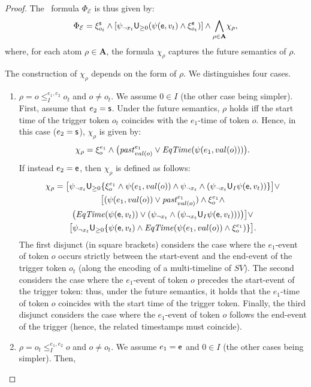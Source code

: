 \begin{proof}
The \MTL\ formula $\Phi_{\mathcal{E}}$ is thus given by:
\[
\Phi_{\mathcal{E}}=\xi^{\mathsf{s}}_{o_t} \wedge [\psi_{\neg x_t}\textsf{U}_{\geq 0}(\psi(\mathsf{e},v_t)\wedge \xi^{\mathsf{e}}_{o_t})]\wedge \displaystyle{\bigwedge_{\rho\in \mathbf{A}}} \chi_\rho,
\]
where, for each atom $\rho\in \mathbf{A}$, the formula $\chi_\rho$ captures the future semantics of $\rho$. 

The construction of $\chi_\rho$ depends on the form of $\rho$. We distinguishes four cases.
\begin{enumerate}
   \item $\rho = o \leq_I^{e_1,e_2} o_t$  and $o\neq o_t$. We assume $0\in I$ (the other case being simpler). First, assume that $e_2=\mathsf{s}$. Under the future semantics,
  $\rho$ holds iff the start time of the trigger token $o_t$ coincides with the $e_1$-time of token $o$. Hence, in this case ($e_2=\mathsf{s}$), $\chi_\rho$ is given by:
  \[
  \chi_\rho = \xi_o^{e_1}\wedge  \bigl({\mathit{past}}_{val(o)}^{e_1}\vee {\mathit{EqTime}}(\psi(e_1,val(o)))\bigr).
  \]
  If instead $e_2 = \mathsf{e}$, then $\chi_\rho$ is defined as follows:
 \begin{multline*}
  \chi_\rho =  \big[\psi_{\neg x_t}\StrictUntil_{\geq 0}\{\xi_o^{e_1}\wedge \psi(e_1,val(o))\wedge \psi_{\neg x_t} \wedge (\psi_{\neg x_t}\StrictUntil_I \psi(\Ending,v_t))\}\big]   \vee 
  \\
  \big[(\psi(e_1,val(o))\vee \Past_{val(o)}^{e_1}) \wedge \xi_o^{e_1} \wedge\\ \big(\EqTime(\psi(\Ending,v_t)) \vee (\psi_{\neg x_t} \wedge (\psi_{\neg x_t}\StrictUntil_I \psi(\Ending,v_t)))\big)\big]   \vee %
  \\
       \big[\psi_{\neg x_t}\StrictUntil_{\geq 0}\{\psi(\Ending,v_t)  \wedge \EqTime(\psi(e_1,val(o))\wedge\xi_o^{e_1})\}\big].
\end{multline*}
 The first disjunct (in square brackets) considers the case where the $e_1$-event of token $o$ occurs strictly between the start-event and the end-event of the trigger token $o_t$ (along the encoding of a multi-timeline of $SV$).
 The second considers the case where the  $e_1$-event of token $o$ precedes the start-event of the trigger token: thus, under the future semantics, it holds that
 the $e_1$-time of token $o$ coincides with the start time of the trigger token. Finally, the third disjunct considers the case where the $e_1$-event of token $o$ follows the
 end-event of the trigger (hence, the related timestamps must coincide).
 \item $\rho = o_t \leq_I^{e_1,e_2} o$ and $o\neq o_t$. We assume $e_1=\mathsf{e}$  and $0\in I$ (the other cases being simpler). Then,

\end{enumerate}
\end{proof}
